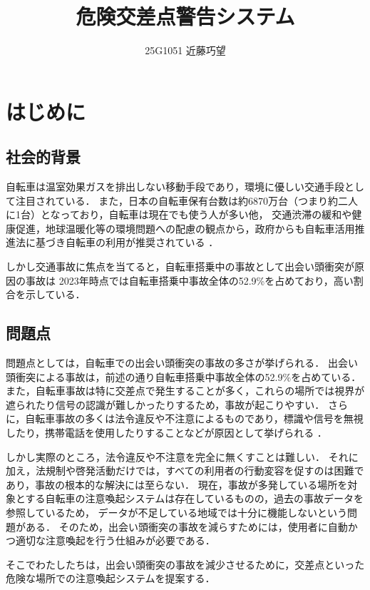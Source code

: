 \documentclass[uplatex,dvipdfmx]{jsarticle}
\begin{document}
\title{危険交差点警告システム}
\author{25G1051 近藤巧望}
\maketitle
\section{はじめに}

\subsection{社会的背景}
自転車は温室効果ガスを排出しない移動手段であり，環境に優しい交通手段として注目されている．
また，日本の自転車保有台数は約6870万台（つまり約二人に1台）となっており，自転車は現在でも使う人が多い他，
交通渋滞の緩和や健康促進，地球温暖化等の環境問題への配慮の観点から，政府からも自転車活用推進法に基づき自転車の利用が推奨されている
\cite{ref:koutuusyou_1,ref:koutuusyou_2}．

しかし交通事故に焦点を当てると，自転車搭乗中の事故として出会い頭衝突が原因の事故は
2023年時点では自転車搭乗中事故全体の52.9\%を占めており，高い割合を示している\cite{ref:sonpo_1}．

\subsection{問題点}
\indent
問題点としては，自転車での出会い頭衝突の事故の多さが挙げられる．
出会い頭衝突による事故は，前述の通り自転車搭乗中事故全体の52.9\%を占めている．
また，自転車事故は特に交差点で発生することが多く，これらの場所では視界が遮られたり信号の認識が難しかったりするため，事故が起こりやすい．
さらに，自転車事故の多くは法令違反や不注意によるものであり，標識や信号を無視したり，携帯電話を使用したりすることなどが原因として挙げられる
\cite{ref:keisatu_1}．
\par
しかし実際のところ，法令違反や不注意を完全に無くすことは難しい．
それに加え，法規制や啓発活動だけでは，すべての利用者の行動変容を促すのは困難であり，事故の根本的な解決には至らない．
現在，事故が多発している場所を対象とする自転車の注意喚起システムは存在しているものの，過去の事故データを参照しているため，
データが不足している地域では十分に機能しないという問題がある．
そのため，出会い頭衝突の事故を減らすためには，使用者に自動かつ適切な注意喚起を行う仕組みが必要である．
\par
そこでわたしたちは，出会い頭衝突の事故を減少させるために，交差点といった危険な場所での注意喚起システムを提案する．
\par
\end{document}
